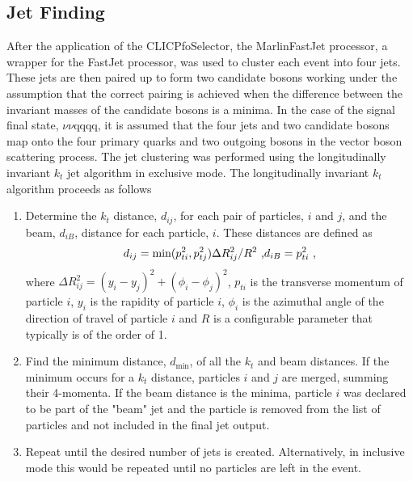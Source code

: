 \subsection{Jet Finding} 
\label{sec:jetpairing}
After the application of the CLICPfoSelector, the MarlinFastJet processor, a wrapper for the FastJet \cite{Cacciari:2011ma} processor, was used to cluster each event into four jets.  These jets are then paired up to form two candidate bosons working under the assumption that the correct pairing is achieved when the difference between the invariant masses of the candidate bosons is a minima.  In the case of the signal final state, $\nu\nu$qqqq, it is assumed that the four jets and two candidate bosons map onto the four primary quarks and two outgoing bosons in the vector boson scattering process.  The jet clustering was performed using the longitudinally invariant $k_{t}$ jet algorithm \cite{Catani:1993hr, Ellis:1993tq} in exclusive mode.  The longitudinally invariant $k_{t}$ algorithm proceeds as follows

\begin{enumerate}
\item Determine the $k_{t}$ distance, $d_{ij}$, for each pair of particles, $i$ and $j$, and the beam, $d_{iB}$, distance for each particle, $i$.  These distances are defined as
\begin{equation}
d_{ij} = \text{min}(p_{ti}^{2}, p_{tj}^{2}){\Delta}R^{2}_{ij}/R^{2} \text{ ,} \\
d_{iB} = p_{ti}^{2} \text{ ,}
\end{equation}
where ${\Delta}R^{2}_{ij} = (y_{i} - y_{j})^2 + (\phi_{i} - \phi_{j})^2$, $p_{ti}$ is the transverse momentum of particle $i$, $y_{i}$ is the rapidity of particle $i$, $\phi_{i}$ is the azimuthal angle of the direction of travel of particle $i$ and $R$ is a configurable parameter that typically is of the order of 1.
\item Find the minimum distance, $d_\text{min}$, of all the $k_{t}$ and beam distances.  If the minimum occurs for a $k_{t}$ distance, particles $i$ and $j$ are merged, summing their 4-momenta.  If the beam distance is the minima, particle $i$ was declared to be part of the "beam" jet and the particle is removed from the list of particles and not included in the final jet output.
\item Repeat until the desired number of jets is created.  Alternatively, in inclusive mode this would be repeated until no particles are left in the event.
\end{enumerate}

